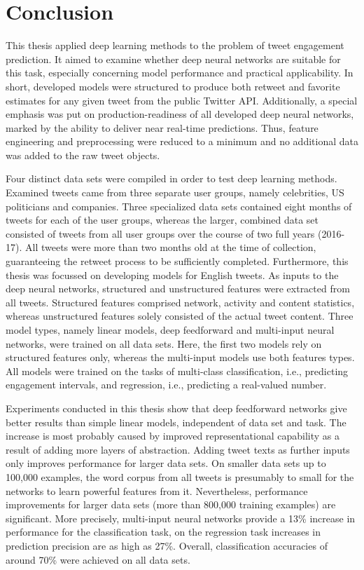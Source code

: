 \section{Conclusion}
\label{ch:conclusion}

This thesis applied deep learning methods to the problem of tweet engagement
prediction.
It aimed to examine whether deep neural networks are suitable for this task, 
especially concerning model performance and practical applicability.
In short, developed models were structured to produce both retweet and favorite
estimates for any given tweet from the public Twitter API.
Additionally, a special emphasis was put on production-readiness of all
developed deep neural networks, marked by the ability to deliver near real-time
predictions.
Thus, feature engineering and preprocessing were reduced to a minimum and no
additional data was added to the raw tweet objects.

Four distinct data sets were compiled in order to test deep learning methods.
Examined tweets came from three separate user groups, namely celebrities, US
politicians and companies.
Three specialized data sets contained eight months of tweets for each of the user
groups, whereas the larger, combined data set consisted of tweets from all
user groups over the course of two full years (2016-17).
All tweets were more than two months old at the time of collection, guaranteeing
the retweet process to be sufficiently completed.
Furthermore, this thesis was focussed on developing models for English tweets.
As inputs to the deep neural networks, structured and unstructured features
were extracted from all tweets.
Structured features comprised network, activity and content statistics, whereas
unstructured features solely consisted of the actual tweet content.
Three model types, namely linear models, deep feedforward and multi-input
neural networks, were trained on all data sets.
Here, the first two models rely on structured features only, whereas the multi-input
models use both features types.
All models were trained on the tasks of multi-class classification, i.e.,
predicting engagement intervals, and regression, i.e., predicting a real-valued
number.

Experiments conducted in this thesis show that deep feedforward networks
give better results than simple linear models, independent of data set and task.
The increase is most probably caused by improved representational capability
as a result of adding more layers of abstraction.
Adding tweet texts as further inputs only improves performance for larger data
sets.
On smaller data sets up to 100,000 examples, the word corpus from all tweets
is presumably to small for the networks to learn powerful features from it.
Nevertheless, performance improvements for larger data sets (more than 800,000
training examples) are significant.
More precisely, multi-input neural networks provide a 13\% increase in performance
for the classification task, on the regression task increases in prediction
precision are as high as 27\%.
Overall, classification accuracies of around 70\% were achieved on all data sets.
